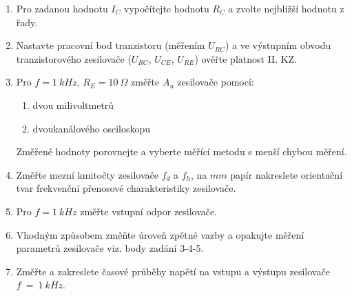 \begin{minipage}[H][11.48cm][c]{0.8\textwidth}
  \begin{enumerate}
    \item
      Pro zadanou hodnotu $I_C$ vypočítejte hodnotu $R_C$ a zvolte nejbližší hodnotu z řady.
    \item
      Nastavte pracovní bod tranzistoru (měřením $U_{RC}$) a ve výstupním obvodu tranzistorového zesilovače ($U_{RC}$, $U_{CE}$, $U_{RE}$) ověřte platnost II. KZ.
    \item
			Pro $f = 1~kHz$, $R_E = 10~\Omega$ změřte $A_u$ zesilovače pomocí:
			\begin{enumerate}
				\item
					dvou milivoltmetrů
				\item
					dvoukanálového osciloskopu
			\end{enumerate}
			Změřené hodnoty porovnejte a vyberte měřící metodu s menší chybou měření.
    \item
      Změřte mezní kmitočty zesilovače $f_d$ a $f_h$, na $mm$ papír nakreslete orientační tvar frekvenční přenosové charakteristiky zesilovače.
    \item
      Pro $f = 1~kHz$ změřte vstupní odpor zesilovače.
		\item
			Vhodným způsobem změňte úroveň zpětné vazby a opakujte měření parametrů zesilovače viz. body zadání 3-4-5.
		\item
			Změřte a zakreslete časové průběhy napětí na vstupu a výstupu zesilovače $f~=~1~kHz$.
	\end{enumerate}
\end{minipage}


